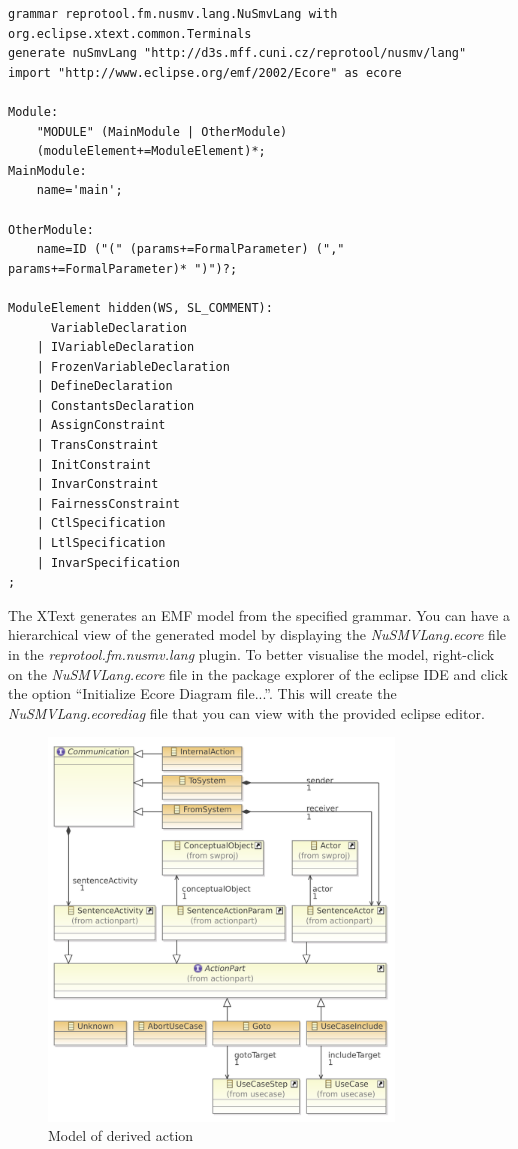 \begin{lstlisting}[language=XtextGrammar]
grammar reprotool.fm.nusmv.lang.NuSmvLang with org.eclipse.xtext.common.Terminals
generate nuSmvLang "http://d3s.mff.cuni.cz/reprotool/nusmv/lang"
import "http://www.eclipse.org/emf/2002/Ecore" as ecore

Module:
	"MODULE" (MainModule | OtherModule)
	(moduleElement+=ModuleElement)*;
MainModule:
	name='main';

OtherModule:
	name=ID ("(" (params+=FormalParameter) ("," params+=FormalParameter)* ")")?;

ModuleElement hidden(WS, SL_COMMENT):
	  VariableDeclaration
	| IVariableDeclaration
	| FrozenVariableDeclaration
	| DefineDeclaration
	| ConstantsDeclaration
	| AssignConstraint
	| TransConstraint
	| InitConstraint
	| InvarConstraint
	| FairnessConstraint
	| CtlSpecification
	| LtlSpecification
	| InvarSpecification
;
\end{lstlisting}

The XText generates an EMF model from the specified grammar. You can have a hierarchical view of the generated model by displaying the
\emph{NuSMVLang.ecore} file in the \emph{reprotool.fm.nusmv.lang} plugin. To better visualise the model, right-click on the \emph{NuSMVLang.ecore} file in
the package explorer of the eclipse IDE and click the option ``Initialize Ecore Diagram file...''. This will create the \emph{NuSMVLang.ecorediag} file that you can view with the provided eclipse editor.

\begin{figure}[ht]
  \centering
  \includegraphics[width=260pt]{images/ReprotoolActionsModel}
  \caption{Model of derived action}
  \label{fig:ReprotoolActionsModel}
\end{figure}


